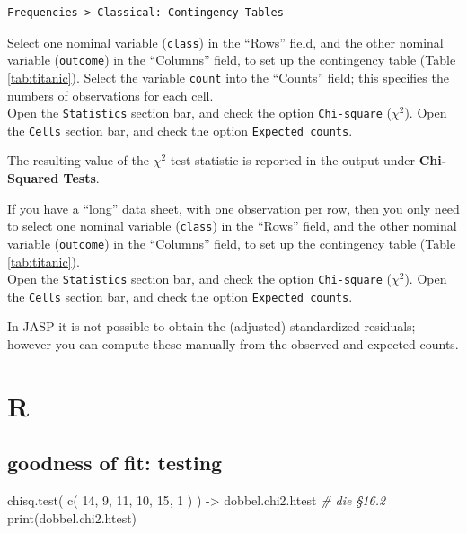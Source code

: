 \documentclass[
]{book}
\newenvironment{Shaded}{\begin{snugshade}}{\end{snugshade}}
\newcommand{\CommentTok}[1]{\textcolor[rgb]{0.56,0.35,0.01}{\textit{#1}}}
\newcommand{\DecValTok}[1]{\textcolor[rgb]{0.00,0.00,0.81}{#1}}
\newcommand{\FunctionTok}[1]{\textcolor[rgb]{0.00,0.00,0.00}{#1}}
\newcommand{\NormalTok}[1]{#1}
\newcommand{\OtherTok}[1]{\textcolor[rgb]{0.56,0.35,0.01}{#1}}
\begin{document}
\begin{verbatim}
Frequencies > Classical: Contingency Tables
\end{verbatim}

Select one nominal variable (\texttt{class}) in the ``Rows'' field, and the other nominal variable (\texttt{outcome}) in the ``Columns'' field, to set up the contingency table (Table \ref{tab:titanic}).
Select the variable \texttt{count} into the ``Counts'' field; this specifies the numbers of observations for each cell.\\
Open the \texttt{Statistics} section bar, and check the option \texttt{Chi-square} (\(\chi^2\)).
Open the \texttt{Cells} section bar, and check the option \texttt{Expected\ counts}.

The resulting value of the \(\chi^2\) test statistic is reported in the output under \textbf{Chi-Squared Tests}.

If you have a ``long'' data sheet, with one observation per row, then you only need to select one nominal variable (\texttt{class}) in the ``Rows'' field, and the other nominal variable (\texttt{outcome}) in the ``Columns'' field, to set up the contingency table (Table \ref{tab:titanic}).\\
Open the \texttt{Statistics} section bar, and check the option \texttt{Chi-square} (\(\chi^2\)).
Open the \texttt{Cells} section bar, and check the option \texttt{Expected\ counts}.

In JASP it is not possible to obtain the (adjusted) standardized residuals; however you can compute these manually from the observed and expected counts.

\hypertarget{r-17}{%
\section{R}\label{r-17}}

\hypertarget{goodness-of-fit-testing-2}{%
\subsection{goodness of fit: testing}\label{goodness-of-fit-testing-2}}

\begin{Shaded}
\begin{Highlighting}[]
\FunctionTok{chisq.test}\NormalTok{( }\FunctionTok{c}\NormalTok{( }\DecValTok{14}\NormalTok{, }\DecValTok{9}\NormalTok{, }\DecValTok{11}\NormalTok{, }\DecValTok{10}\NormalTok{, }\DecValTok{15}\NormalTok{, }\DecValTok{1}\NormalTok{ ) ) }\OtherTok{{-}\textgreater{}}\NormalTok{ dobbel.chi2.htest }\CommentTok{\# die §16.2}
\FunctionTok{print}\NormalTok{(dobbel.chi2.htest)}
\end{Highlighting}
\end{Shaded}
\end{document}
